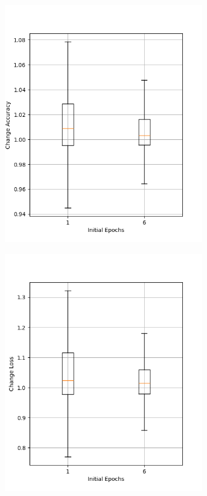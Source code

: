 \begin{figure}
    \begin{subfigure}{0.5\textwidth}
        \centering
        \includegraphics[width=0.95\textwidth]{plots/InitEpoch_Trained_accuracy.png}
    \end{subfigure}
    \begin{subfigure}{0.5\textwidth}
        \centering
        \includegraphics[width=0.95\textwidth]{plots/InitEpoch_Trained_loss.png}

\end{subfigure}
\end{figure}
